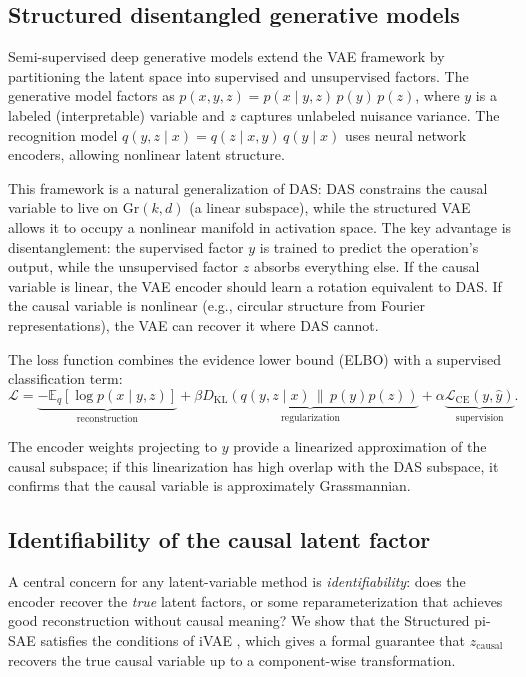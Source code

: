 \documentclass{article}
\newcommand{\Gr}{\mathrm{Gr}}
\begin{document}
\subsection{Structured disentangled generative models}
\label{sec:structured_vae}

Semi-supervised deep generative models \citep{narayanaswamy2017learning} extend
the VAE framework \citep{kingma2014auto} by partitioning the latent space into
supervised and unsupervised factors. The generative model factors as
$p(x, y, z) = p(x \mid y, z) \, p(y) \, p(z)$, where $y$ is a labeled
(interpretable) variable and $z$ captures unlabeled nuisance variance. The
recognition model $q(y, z \mid x) = q(z \mid x, y) \, q(y \mid x)$ uses neural
network encoders, allowing nonlinear latent structure.

This framework is a natural generalization of DAS: DAS constrains the causal
variable to live on $\Gr(k,d)$ (a linear subspace), while the structured VAE
allows it to occupy a nonlinear manifold in activation space. The key advantage
is disentanglement: the supervised factor $y$ is trained to predict the
operation's output, while the unsupervised factor $z$ absorbs everything else.
If the causal variable is linear, the VAE encoder should learn a rotation
equivalent to DAS. If the causal variable is nonlinear (e.g., circular
structure from Fourier representations), the VAE can recover it where DAS
cannot.

The loss function combines the evidence lower bound (ELBO) with a supervised
classification term:
\begin{equation}
\mathcal{L} = \underbrace{-\mathbb{E}_{q}[\log p(x \mid y, z)]}_{\text{reconstruction}}
+ \beta \underbrace{D_\mathrm{KL}(q(y,z \mid x) \,\|\, p(y) p(z))}_{\text{regularization}}
+ \alpha \underbrace{\mathcal{L}_\text{CE}(y, \hat{y})}_{\text{supervision}}.
\label{eq:vae_loss}
\end{equation}

The encoder weights projecting to $y$ provide a linearized approximation of the
causal subspace; if this linearization has high overlap with the DAS subspace,
it confirms that the causal variable is approximately Grassmannian.

\subsection{Identifiability of the causal latent factor}
\label{sec:identifiability}

A central concern for any latent-variable method is \emph{identifiability}:
does the encoder recover the \emph{true} latent factors, or some
reparameterization that achieves good reconstruction without causal meaning?
We show that the Structured pi-SAE satisfies the conditions of iVAE
\citep{khemakhem2020variational}, which gives a formal guarantee that
$z_\text{causal}$ recovers the true causal variable up to a
component-wise transformation.
\end{document}
